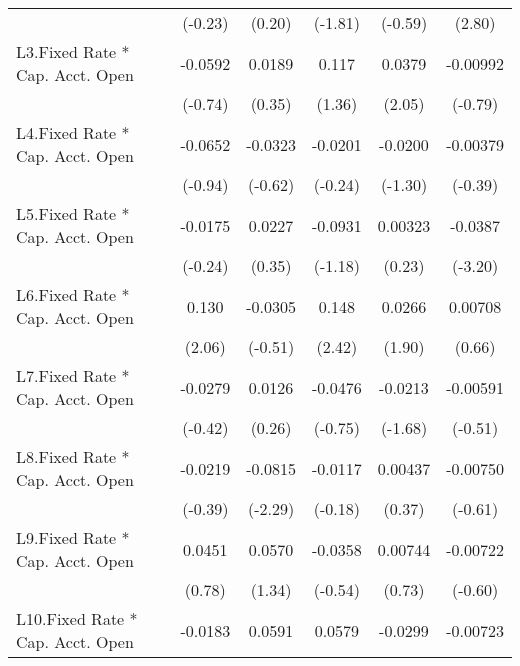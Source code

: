 {\begin{longtable}{l*{5}{c}}
                &  (-0.23)         &   (0.20)         &  (-1.81)         &  (-0.59)         &   (2.80)         \\
[1em]
L3.Fixed Rate * Cap. Acct. Open&  -0.0592         &   0.0189         &    0.117         &   0.0379\sym{*}  & -0.00992         \\
                &  (-0.74)         &   (0.35)         &   (1.36)         &   (2.05)         &  (-0.79)         \\
[1em]
L4.Fixed Rate * Cap. Acct. Open&  -0.0652         &  -0.0323         &  -0.0201         &  -0.0200         & -0.00379         \\
                &  (-0.94)         &  (-0.62)         &  (-0.24)         &  (-1.30)         &  (-0.39)         \\
[1em]
L5.Fixed Rate * Cap. Acct. Open&  -0.0175         &   0.0227         &  -0.0931         &  0.00323         &  -0.0387\sym{**} \\
                &  (-0.24)         &   (0.35)         &  (-1.18)         &   (0.23)         &  (-3.20)         \\
[1em]
L6.Fixed Rate * Cap. Acct. Open&    0.130\sym{*}  &  -0.0305         &    0.148\sym{*}  &   0.0266         &  0.00708         \\
                &   (2.06)         &  (-0.51)         &   (2.42)         &   (1.90)         &   (0.66)         \\
[1em]
L7.Fixed Rate * Cap. Acct. Open&  -0.0279         &   0.0126         &  -0.0476         &  -0.0213         & -0.00591         \\
                &  (-0.42)         &   (0.26)         &  (-0.75)         &  (-1.68)         &  (-0.51)         \\
[1em]
L8.Fixed Rate * Cap. Acct. Open&  -0.0219         &  -0.0815\sym{*}  &  -0.0117         &  0.00437         & -0.00750         \\
                &  (-0.39)         &  (-2.29)         &  (-0.18)         &   (0.37)         &  (-0.61)         \\
[1em]
L9.Fixed Rate * Cap. Acct. Open&   0.0451         &   0.0570         &  -0.0358         &  0.00744         & -0.00722         \\
                &   (0.78)         &   (1.34)         &  (-0.54)         &   (0.73)         &  (-0.60)         \\
[1em]
L10.Fixed Rate * Cap. Acct. Open&  -0.0183         &   0.0591         &   0.0579         &  -0.0299         & -0.00723         \\

\end{longtable}}
